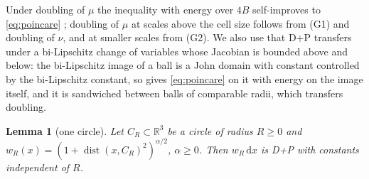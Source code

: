 \documentclass[11pt]{amsart}
\newcommand{\R}{\mathbb{R}}
\newcommand{\dd}{\,\mathrm{d}}
\DeclareMathOperator{\dist}{dist}
\theoremstyle{plain}
\newtheorem{lemma}[theorem]{Lemma}
\theoremstyle{definition}
\theoremstyle{remark}
\begin{document}
Under doubling of $\mu$ the inequality with energy over $4B$ self-improves to
\eqref{eq:poincare} \cite[Thms.~5.1 and~9.7]{hajlaszkoskela2000}; doubling of $\mu$ at scales
above the cell size follows from (G1) and doubling of $\nu$, and at smaller
scales from (G2). We also use that D+P transfers under a bi-Lipschitz change of
variables whose Jacobian is bounded above and below: the bi-Lipschitz image of a
ball is a John domain with constant controlled by the bi-Lipschitz constant, so
\cite[Thm.~9.7]{hajlaszkoskela2000} gives \eqref{eq:poincare} on it with energy
on the image itself, and it is sandwiched between balls of comparable radii,
which transfers doubling.

\begin{lemma}[one circle]\label{lem:circle}
Let $C_R\subset\R^3$ be a circle of radius $R\ge0$ and $w_R(x)=(1+\dist(x,C_R)^2)^{\alpha/2}$,
$\alpha\ge0$. Then $w_R\dd x$ is D+P with constants independent of $R$.
\end{lemma}
\end{document}
